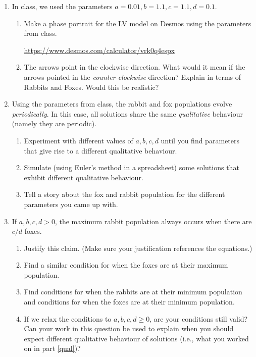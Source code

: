 \begin{enumerate}
	\item In class, we used the parameters $a=0.01, b=1.1, c=1.1, d=0.1$.

	\begin{enumerate}
		\item	Make a phase portrait for the LV model on Desmos 
			using the parameters from class.

		\url{https://www.desmos.com/calculator/vrk0q4espx}

		\item The arrows point in the clockwise direction. What would
			it mean if the arrows pointed in the
			\emph{counter-clockwise} direction? Explain in terms 
			of Rabbits and Foxes. Would this be realistic?
	\end{enumerate}

	\item \label{qual}
		Using the parameters from class, the rabbit and fox populations 
		evolve \emph{periodically}. In this case, all
		solutions share the same \emph{qualitative}
		behaviour (namely they are periodic).

		\begin{enumerate}
			\item Experiment with different values of $a,b,c,d$ until you
				find parameters that give rise to a different
				qualitative behaviour.
			\item Simulate (using Euler's method in a spreadsheet) some
				solutions that exhibit different qualitative
				behaviour.
			\item Tell a story about the fox and rabbit population for
				the different parameters you came up with.
		\end{enumerate}
		
		\item If $a,b,c,d>0$, the maximum rabbit population always
			occurs when there are $c/d$ foxes.
		\begin{enumerate}
			\item Justify this claim. (Make sure your justification references the equations.)
			\item Find a similar condition for when the foxes are at their maximum population.
			\item Find conditions for when the rabbits are at their minimum population and
				conditions for when the foxes are at their minimum population.
			\item If we relax the conditions to $a,b,c,d\geq 0$, are your conditions still valid?
				Can your work in this question be used to explain when you should
				expect different qualitative behaviour of solutions (i.e., what
				you worked on in part \ref{qual})?
		\end{enumerate}


\end{enumerate}
